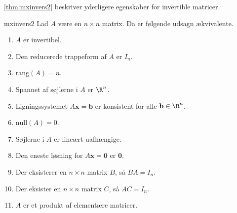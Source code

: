 \ref{thm:mxinvers2} beskriver yderligere egenskaber for invertible matricer. 
%
\begin{thm}{}{mxinvers2}
Lad $A$ være en $n \times n$ matrix. 
Da er følgende udsagn ækvivalente.
\begin{enumerate}[label=(\alph*)]
\item $A$ er invertibel.
\item Den reducerede trappeform af $A$ er $I_n$.
\item $\text{rang}(A)=n$.
\item Spannet af søjlerne i $A$ er $\R^n$.
\item Ligningssystemet $A\textbf{x}=\textbf{b}$ er konsistent for alle $\textbf{b} \in \R^n$.
\item $\text{null}(A)=0$.
\item Søjlerne i $A$ er lineært uafhængige.
\item Den eneste løsning for $A\textbf{x}=\textbf{0}$ er $\textbf{0}$.
\item Der eksisterer en $n \times n$ matrix $B$, så $BA=I_n$.
\item Der eksister en $n \times n$ matrix $C$, så $AC=I_n$.
\item $A$ er et produkt af elementære matricer.
\end{enumerate}
\end{thm}
%
\newpage
%
